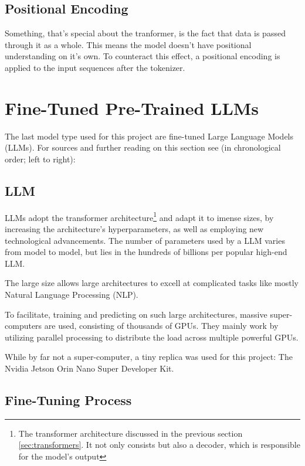 \documentclass{article}
\begin{document}
\subsection{Positional Encoding}

Something, that's special about the tranformer, is the fact that data is passed 
through it as a whole. This means the model doesn't have positional understanding 
on it's own. To counteract this effect, a positional encoding is applied to the 
input sequences after the tokenizer.

\newpage
\section{Fine-Tuned Pre-Trained LLMs}

The last model type used for this project are fine-tuned Large 
Language Models (LLMs).
For sources and further reading on this section see (in chronological order; 
left to right): \cite{geeksforgeeks_2024,Stryker_LLM,srinivasan2024transformer,Bergmann_Fine_Tuning}


\subsection{LLM}

LLMs adopt the transformer architecture\footnote{The transformer architecture 
discussed in the previous section \ref{sec:transformers}. It not only consists 
but also a decoder, which is responsible for the model's output} and adapt it 
to imense sizes, by increasing the architecture's hyperparameters, as well as 
employing new technological advancements. The number of parameters used by a 
LLM varies from model to model, but lies in the hundreds of billions per 
popular high-end LLM.

The large size allows large architectures to excell at complicated tasks like 
mostly Natural Language Processing (NLP).

To facilitate, training and predicting on such large architectures, massive super-
computers are used, consisting of thousands of GPUs. They mainly work by utilizing 
parallel processing to distribute the load across multiple powerful GPUs. 

While by far not a super-computer, a tiny replica was used for this project: 
The Nvidia Jetson Orin Nano Super Developer Kit.


\subsection{Fine-Tuning Process}
\end{document}
